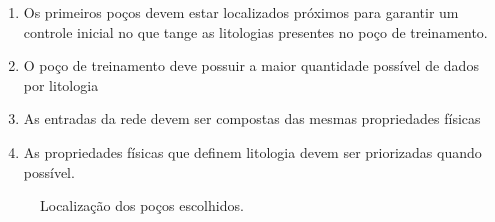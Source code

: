 \begin{enumerate}
	\item Os primeiros poços devem estar localizados próximos para garantir um controle inicial no que tange as litologias presentes no poço de treinamento. 
	\item O poço de treinamento deve possuir a maior quantidade possível de dados por litologia
	\item As entradas da rede devem ser compostas das mesmas propriedades físicas
	\item As propriedades físicas que definem litologia devem ser priorizadas quando possível.
\end{enumerate}

\begin{figure}[H]
	\centering
	\setlength{\fboxsep}{8pt}
	\setlength{\fboxrule}{0.1pt}
	\caption{Localização dos poços escolhidos.}
	\label{loc01}
\end{figure}


